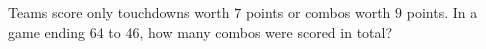 Teams score only touchdowns worth $7$ points or combos worth $9$ points. In a game ending $64$ to $46$, how many combos were scored in total?
